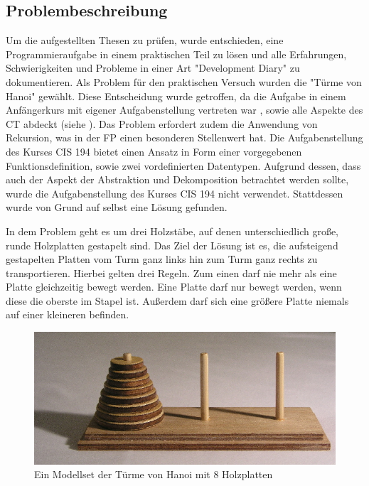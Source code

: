 \subsection{Problembeschreibung}\label{sec:problemdesc}
Um die aufgestellten Thesen zu prüfen, wurde entschieden, eine Programmieraufgabe in einem praktischen Teil zu lösen und alle Erfahrungen, Schwierigkeiten und Probleme in einer Art "Development Diary" zu dokumentieren.
Als Problem für den praktischen Versuch wurden die "Türme von Hanoi" gewählt. Diese Entscheidung wurde getroffen, da die Aufgabe in einem Anfängerkurs mit eigener Aufgabenstellung vertreten war \cite{cis194}, sowie alle Aspekte des CT abdeckt (siehe ). Das Problem erfordert zudem die Anwendung von Rekursion, was in der FP einen besonderen Stellenwert hat.
Die Aufgabenstellung des Kurses CIS 194 bietet einen Ansatz in Form einer vorgegebenen Funktionsdefinition, sowie zwei vordefinierten Datentypen. Aufgrund dessen, dass auch der Aspekt der Abstraktion und Dekomposition betrachtet werden sollte, wurde die Aufgabenstellung des Kurses CIS 194 nicht verwendet. Stattdessen wurde von Grund auf selbst eine Lösung gefunden.

In dem Problem geht es um drei Holzstäbe, auf denen unterschiedlich große, runde Holzplatten gestapelt sind. Das Ziel der Lösung ist es, die aufsteigend gestapelten Platten vom Turm ganz links hin zum Turm ganz rechts zu transportieren. Hierbei gelten drei Regeln. Zum einen darf nie mehr als eine Platte gleichzeitig bewegt werden. Eine Platte darf nur bewegt werden, wenn diese die oberste im Stapel ist. Außerdem darf sich eine größere Platte niemals auf einer kleineren befinden.

\begin{figure}[H]
    \centering
    \includegraphics[width=1\linewidth]{Figures/Section_4/hanoi}
    \caption{Ein Modellset der Türme von Hanoi mit 8 Holzplatten \protect\cite{wikicommons}}
\end{figure}

